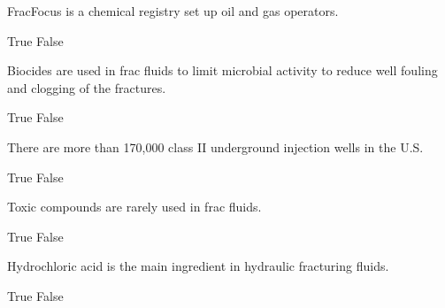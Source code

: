 \begin{naquestion}[individual=true]
\label{qid.GEOG_Unit4_quiz.03}
FracFocus is a chemical registry set up oil and gas operators.
\begin{naqmultiplechoicepart}
\begin{naqchoices}
    \naqchoice True 
    \naqchoice[1] False
\end{naqchoices}
\end{naqmultiplechoicepart}
\end{naquestion}

\begin{naquestion}[individual=true]
\label{qid.GEOG_Unit4_quiz.04}
Biocides are used in frac fluids to limit microbial activity to reduce well fouling and clogging of the fractures.
\begin{naqmultiplechoicepart}
\begin{naqchoices}
    \naqchoice[1] True 
    \naqchoice False
\end{naqchoices}
\end{naqmultiplechoicepart}
\end{naquestion}

\begin{naquestion}[individual=true]
\label{qid.GEOG_Unit4_quiz.05}
There are more than 170,000 class II underground injection wells in the U.S.
\begin{naqmultiplechoicepart}
\begin{naqchoices}
    \naqchoice[1] True 
    \naqchoice False
\end{naqchoices}
\end{naqmultiplechoicepart}
\end{naquestion}

\begin{naquestion}[individual=true]
\label{qid.GEOG_Unit4_quiz.06}
Toxic compounds are rarely used in frac fluids.
\begin{naqmultiplechoicepart}
\begin{naqchoices}
    \naqchoice True 
    \naqchoice[1] False
\end{naqchoices}
\end{naqmultiplechoicepart}
\end{naquestion}

\begin{naquestion}[individual=true]
\label{qid.GEOG_Unit4_quiz.07}
Hydrochloric acid is the main ingredient in hydraulic fracturing fluids.
\begin{naqmultiplechoicepart}
\begin{naqchoices}
    \naqchoice True 
    \naqchoice[1] False
\end{naqchoices}
\end{naqmultiplechoicepart}
\end{naquestion}

